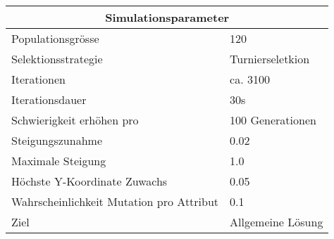 
\begin{tabular}{ | l | l | }

  \hline
  \multicolumn{2}{|c|}{Simulationsparameter} \\
  \hline
  Populationsgrösse & 120 \\ \hline
  Selektionsstrategie & Turnierseletkion \\ \hline
  Iterationen & ca. 3100 \\ \hline
  Iterationsdauer & 30s \\ \hline
  Schwierigkeit erhöhen pro & 100 Generationen \\ \hline
  Steigungszunahme & 0.02 \\ \hline
  Maximale Steigung & 1.0 \\ \hline
  Höchste Y-Koordinate Zuwachs & 0.05 \\ \hline
  Wahrscheinlichkeit Mutation pro Attribut & 0.1 \\ \hline
  Ziel & Allgemeine Lösung \\ \hline

\end{tabular}
